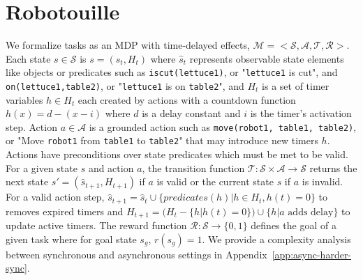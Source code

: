 \vspace{-1em}
\section{Robotouille}
\label{sec:formulation}
\vspace{-1em}


We formalize \robotouille{} tasks as an MDP with time-delayed effects, $\mathcal{M} = <\mathcal{S}, \mathcal{A}, \mathcal{T}, \mathcal{R}>$. Each state $s \in \mathcal{S}$ is $s = (\hat s_t, H_t)$ where $\hat s_t$ represents observable state elements like objects or predicates such as \texttt{iscut(lettuce1)}, or "\texttt{lettuce1} is cut", and \texttt{on(lettuce1,table2)}, or "\texttt{lettuce1} is on \texttt{table2}", and $H_t$ is a set of timer variables $h \in H_t$ each created by actions with a countdown function $h(x) = d - (x - i)$ where $d$ is a delay constant and $i$ is the timer's activation step. Action $a \in \mathcal{A}$ is a grounded action such as \texttt{move(robot1, table1, table2)}, or "Move \texttt{robot1} from \texttt{table1} to \texttt{table2}" that may introduce new timers $h$. Actions have preconditions over state predicates which must be met to be valid. For a given state $s$ and action $a$, the transition function $\mathcal{T} \colon \mathcal{S} \times \mathcal{A} \rightarrow \mathcal{S}$ returns the next state $s' = (\hat s_{t+1}, H_{t+1})$ if $a$ is valid or the current state $s$ if $a$ is invalid. For a valid action step, $\hat s_{t+1} = \hat s_t \cup \{predicates(h)|h \in H_t, h(t) = 0 \}$ to removes expired timers and $H_{t+1} = (H_t - \{ h|h(t) = 0\}) \cup \{h|a \text{ adds delay}\}$ to update active timers. The reward function $\mathcal{R} \colon \mathcal{S} \rightarrow \{0, 1\}$ defines the goal of a given task where for goal state $s_g$, $r(s_g) = 1$. We provide a complexity analysis between synchronous and asynchronous settings in Appendix~\ref{app:async-harder-sync}.


